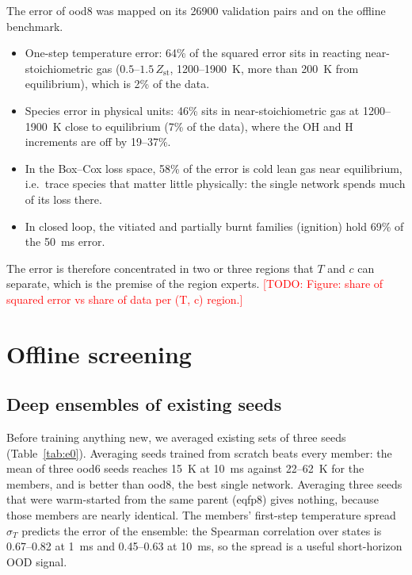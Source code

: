 \documentclass[preprint,review,12pt]{elsarticle}
\newcommand{\todo}[1]{\textcolor{red}{[TODO: #1]}}
\begin{document}
The error of ood8 was mapped on its \num{26900} validation pairs and on the offline benchmark.
\begin{itemize}
\item One-step temperature error: 64\% of the squared error sits in reacting near-stoichiometric gas
  ($0.5$--$1.5\,Z_\mathrm{st}$, 1200--1900~K, more than 200~K from equilibrium), which is 2\% of the data.
\item Species error in physical units: 46\% sits in near-stoichiometric gas at 1200--1900~K close to
  equilibrium (7\% of the data), where the OH and H increments are off by 19--37\%.
\item In the Box--Cox loss space, 58\% of the error is cold lean gas near equilibrium, i.e.\ trace species
  that matter little physically: the single network spends much of its loss there.
\item In closed loop, the vitiated and partially burnt families (ignition) hold 69\% of the 50~ms error.
\end{itemize}
The error is therefore concentrated in two or three regions that $T$ and $c$ can separate, which is the
premise of the region experts.
\todo{Figure: share of squared error vs share of data per (T, c) region.}

\section{Offline screening}
\label{sec:offline}

\subsection{Deep ensembles of existing seeds}
Before training anything new, we averaged existing sets of three seeds (Table~\ref{tab:e0}). Averaging
seeds trained from scratch beats every member: the mean of three ood6 seeds reaches 15~K at 10~ms against
22--62~K for the members, and is better than ood8, the best single network. Averaging three seeds that
were warm-started from the same parent (eqfp8) gives nothing, because those members are nearly identical.
The members' first-step temperature spread $\sigma_T$ predicts the error of the ensemble: the Spearman
correlation over states is 0.67--0.82 at 1~ms and 0.45--0.63 at 10~ms, so the spread is a useful
short-horizon OOD signal.
\end{document}
